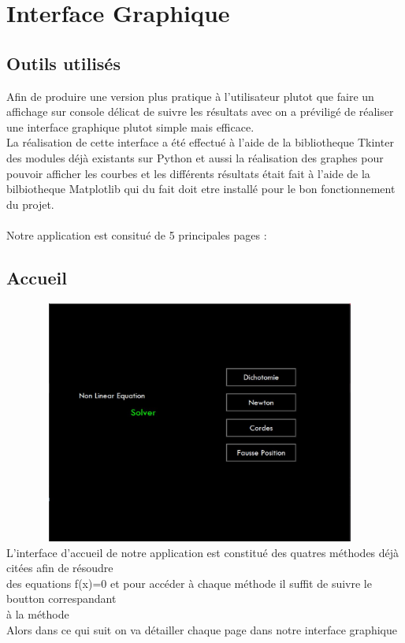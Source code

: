 \documentclass{article}
\begin{document}
       

\section{Interface Graphique}
\subsection{Outils utilisés}
Afin de produire une version plus pratique à l'utilisateur plutot que faire un affichage sur console délicat de suivre les résultats avec on a préviligé de réaliser une interface graphique plutot simple mais efficace.\\
La réalisation de cette interface a été effectué à l'aide de la bibliotheque Tkinter des modules déjà existants sur Python et aussi la réalisation des graphes pour pouvoir afficher les courbes et les différents résultats était fait à l'aide de la bilbiotheque Matplotlib qui du fait doit etre installé pour le bon fonctionnement du projet.
\\ \\
Notre application est consitué de 5 principales pages :
\subsection{Accueil}
\includegraphics[width=13cm,height=8cm]{img/accueil.JPG}\\

L'interface d'accueil de notre application est constitué des quatres méthodes déjà citées afin de résoudre \\ des equations f(x)=0 et pour accéder à chaque méthode il suffit de suivre le boutton correspandant \\
à la méthode\\
Alors dans ce qui suit on va détailler chaque page dans notre interface graphique 
\end{document}
